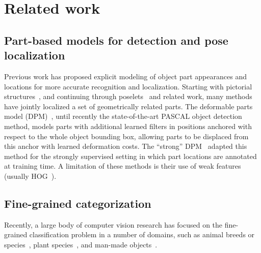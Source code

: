 \section{Related work}

\subsection{Part-based models for detection and pose localization}
Previous work has proposed explicit modeling of object part appearances and locations for more accurate recognition and localization.
Starting with pictorial structures~\cite{pedro2000,pictorial},
and continuing through poselets~\cite{BourdevMalikICCV09} and related work, many methods have jointly localized a set of geometrically related parts.
The deformable parts model (DPM)~\cite{dpm}, until recently the state-of-the-art PASCAL object detection method, models parts with additional learned filters in positions anchored with respect to the whole object bounding box, allowing parts to be displaced from this anchor with learned deformation costs.
The ``strong'' DPM~\cite{Hossein_ECCV12} adapted this method for the strongly supervised setting in which part locations are annotated at training time.
A limitation of these methods is their use of weak features (usually HOG~\cite{hog}). 

\subsection{Fine-grained categorization}
Recently, a large body of computer vision research has focused on the fine-grained classification problem
in a number of domains, such as animal breeds or species~\cite{BirdletsFarrellICCV11,KhoslaYaoJayadevaprakashFeiFei_FGVC2011,Liu_Dogs_2012,MartinezMunozEtalCVPR2009,ParkhiEtalCVPR12,YaoEtalCVPR11}, plant species~\cite{AngelovaCVPR13,Anelia13,leafsnap,nilsback_visual_2006,nilsback_automated_2008,VantageFramesCVPR13}, and man-made objects~\cite{maji13fine-grained,StarkKrauseBMVC12}. 

